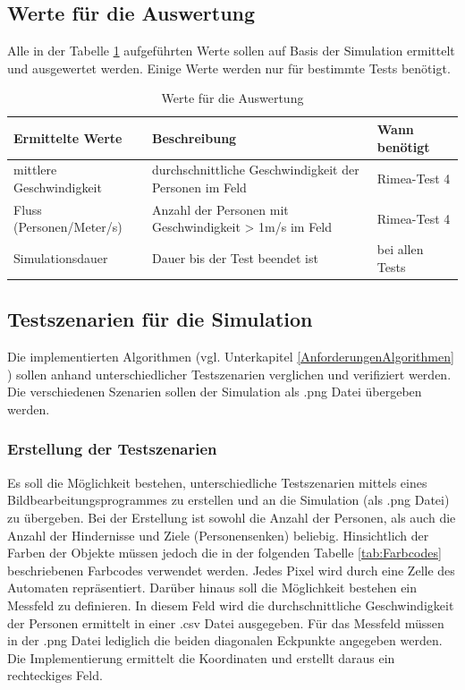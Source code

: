 \subsection{Werte für die Auswertung}
Alle in der Tabelle \ref{tab:WerteAuswertung} aufgeführten Werte sollen auf Basis der Simulation ermittelt und ausgewertet werden. Einige Werte werden nur für bestimmte Tests benötigt.
\begin{table}[htpb]
	\centering
	\begin{tabular}{lll}
		Ermittelte Werte & Beschreibung & Wann benötigt\\ \hline
		mittlere Geschwindigkeit & durchschnittliche Geschwindigkeit der Personen im Feld & Rimea-Test 4 \\	
		Fluss (Personen/Meter/s) & Anzahl der Personen mit Geschwindigkeit > 1m/s im Feld & Rimea-Test 4\\
		Simulationsdauer & Dauer bis der Test beendet ist & bei allen Tests
	\end{tabular}
	\caption{Werte für die Auswertung}
	\label{tab:WerteAuswertung}
\end{table}

\subsection{Testszenarien für die Simulation}
\label{AnforderungenTest}

Die implementierten Algorithmen (vgl. Unterkapitel \ref{AnforderungenAlgorithmen} ) sollen anhand unterschiedlicher Testszenarien verglichen und verifiziert werden. Die verschiedenen Szenarien sollen der Simulation als .png Datei übergeben werden. 

\subsubsection{Erstellung der Testszenarien}
Es soll die Möglichkeit bestehen, unterschiedliche Testszenarien mittels eines Bildbearbeitungsprogrammes zu erstellen und an die Simulation (als .png Datei) zu übergeben. Bei der Erstellung ist sowohl die Anzahl der Personen, als auch die Anzahl der Hindernisse und Ziele (Personensenken) beliebig. Hinsichtlich der Farben der Objekte müssen jedoch die in der folgenden Tabelle \ref{tab:Farbcodes} beschriebenen Farbcodes verwendet werden. Jedes Pixel wird durch eine Zelle des Automaten repräsentiert. Darüber hinaus soll die Möglichkeit bestehen ein Messfeld zu definieren. In diesem Feld wird die durchschnittliche Geschwindigkeit der Personen ermittelt in einer .csv Datei ausgegeben. Für das Messfeld müssen in der .png Datei lediglich die beiden diagonalen Eckpunkte angegeben werden. Die Implementierung ermittelt die Koordinaten und erstellt daraus ein rechteckiges Feld. 
 
